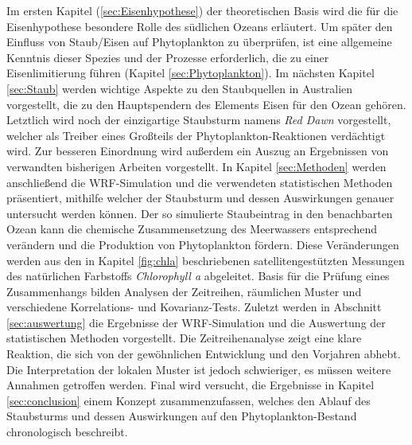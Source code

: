 \documentclass[12pt,a4paper,onecolumn]{scrartcl}
\begin{document}
Im ersten Kapitel (\ref{sec:Eisenhypothese}) der theoretischen Basis wird die für die Eisenhypothese besondere Rolle des südlichen Ozeans erläutert. Um später den Einfluss von Staub/Eisen auf Phytoplankton zu überprüfen, ist eine allgemeine Kenntnis dieser Spezies und der Prozesse erforderlich, die zu einer Eisenlimitierung führen (Kapitel \ref{sec:Phytoplankton}). Im nächsten Kapitel \ref{sec:Staub} werden wichtige Aspekte zu den Staubquellen in Australien vorgestellt, die zu den Hauptspendern des Elements Eisen für den Ozean gehören. Letztlich wird noch der einzigartige Staubsturm namens \textit{Red Dawn} vorgestellt, welcher als Treiber eines Großteils der Phytoplankton-Reaktionen verdächtigt wird. Zur besseren Einordnung wird außerdem ein Auszug an Ergebnissen von verwandten bisherigen Arbeiten vorgestellt. In Kapitel \ref{sec:Methoden} werden anschließend die WRF-Simulation und die verwendeten statistischen Methoden präsentiert, mithilfe welcher der Staubsturm und dessen Auswirkungen genauer untersucht werden können. Der so simulierte Staubeintrag in den benachbarten Ozean kann die chemische Zusammensetzung des Meerwassers entsprechend verändern und die Produktion von Phytoplankton fördern. Diese Veränderungen werden aus den in Kapitel \ref{fig:chla} beschriebenen satellitengestützten Messungen des natürlichen Farbstoffs \textit{Chlorophyll a} abgeleitet. Basis für die Prüfung eines Zusammenhangs bilden Analysen der Zeitreihen, räumlichen Muster und verschiedene Korrelations- und Kovarianz-Tests. Zuletzt werden in Abschnitt \ref{sec:auswertung} die Ergebnisse der WRF-Simulation und die Auswertung der statistischen Methoden vorgestellt. Die Zeitreihenanalyse zeigt eine klare Reaktion, die sich von der gewöhnlichen Entwicklung und den Vorjahren abhebt. Die Interpretation der lokalen Muster ist jedoch schwieriger, es müssen weitere Annahmen getroffen werden. Final wird versucht, die Ergebnisse in Kapitel \ref{sec:conclusion} einem Konzept zusammenzufassen, welches den Ablauf des Staubsturms und dessen Auswirkungen auf den Phytoplankton-Bestand chronologisch beschreibt.
\end{document}
